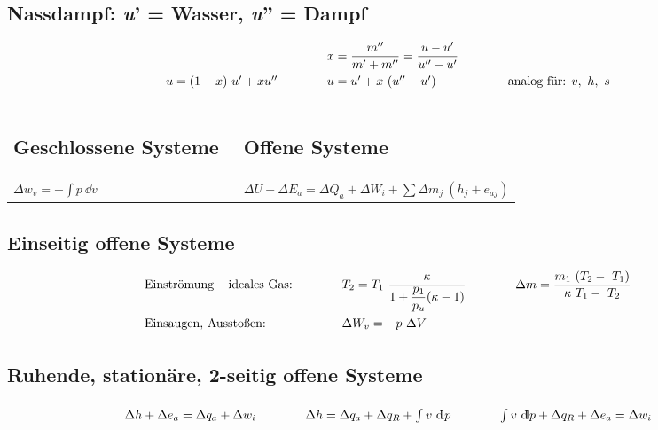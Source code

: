 \subsection{Nassdampf:  \textit{u}'  = Wasser,  \textit{u}''  = Dampf}
%
	\setlength{\abovedisplayshortskip}{-18pt}
		\[ \arraycolsep=2em  \def\arraystretch{1.5}
		\begin{array}{lll}
			                      & x = \dfrac{m''}{m'+m''} = \dfrac{u-u'}{u''-u'} &                                \\
			u = (1-x)\ u' + x u'' & u = u' + x\ (u''-u')                           & \text{analog für: }  v,\ h,\ s
		\end{array} \]
%
\vspace {-1em}
%
\begin{flushleft}
	\setlength{\tabcolsep}{0em} %
	\begin{tabular}{lp{4em}l}
		\parbox{6cm}{\subsection{Geschlossene Systeme}} &  & \parbox{5cm}{\subsection{Offene Systeme}}                                                    \\
		\qquad  $ \Delta w_v = -\int p \ \dd v $        &  & \qquad $ \Delta U + \Delta E_a = \Delta Q_a + \Delta W_i + \sum \Delta m_j \ (h_j+ e_{aj}) $
	\end{tabular}
\end{flushleft}

\subsection{Einseitig offene Systeme}
%
	\setlength{\abovedisplayskip}{-20pt} %
		\[ \arraycolsep=2em %
		\begin{array}{lll}
			\text{Einströmung -- ideales Gas:} &  T_2 = T_1\ \dfrac{\kappa}{1+\dfrac{p_1}{p_u}(\kappa-1)}  &  \Delta m = \dfrac{m_1\ (T_2-\ T_1)}{\kappa\ T_1-\ T_2}  \\
			\text{Einsaugen, Ausstoßen:}       &  \Delta W_v = -p\ \Delta V                                &
		\end{array} \]

\subsection{Ruhende, stationäre, 2-seitig offene Systeme}
%
	\setlength{\abovedisplayskip}{-20pt}
	\[\arraycolsep=2em
		\begin{array}{lll}
			\Delta h + \Delta e_a = \Delta q_a + \Delta w_i & \Delta h = \Delta q_a + \Delta q_R + \int v\ \dd p & \int v\ \dd p + \Delta q_R + \Delta e_a = \Delta w_i
		\end{array} \]
